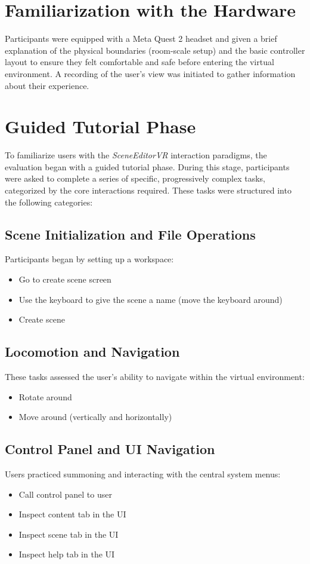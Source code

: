 \documentclass[inscr,ack,preface]{dithesis}
\begin{document}
\section{Familiarization with the Hardware}
Participants were equipped with a Meta Quest 2 headset and given a brief explanation of the physical boundaries
(room-scale setup) and the basic controller layout to ensure they felt comfortable and safe before entering the virtual environment. A recording of the user's view was initiated
to gather information about their experience.

\section{Guided Tutorial Phase}
To familiarize users with the \textit{SceneEditorVR} interaction paradigms, the evaluation began with a guided tutorial phase.
During this stage, participants were asked to complete a series of specific, progressively complex tasks, categorized by the core interactions required.
These tasks were structured into the following categories:

\subsection{Scene Initialization and File Operations}
Participants began by setting up a workspace:
\begin{itemize}
  \item Go to create scene screen
  \item Use the keyboard to give the scene a name (move the keyboard around)
  \item Create scene
\end{itemize}

\subsection{Locomotion and Navigation}
These tasks assessed the user's ability to navigate within the virtual environment:
\begin{itemize}
  \item Rotate around
  \item Move around (vertically and horizontally)
\end{itemize}

\subsection{Control Panel and UI Navigation}
Users practiced summoning and interacting with the central system menus:
\begin{itemize}
  \item Call control panel to user
  \item Inspect content tab in the UI
  \item Inspect scene tab in the UI
  \item Inspect help tab in the UI
\end{itemize}
\end{document}
